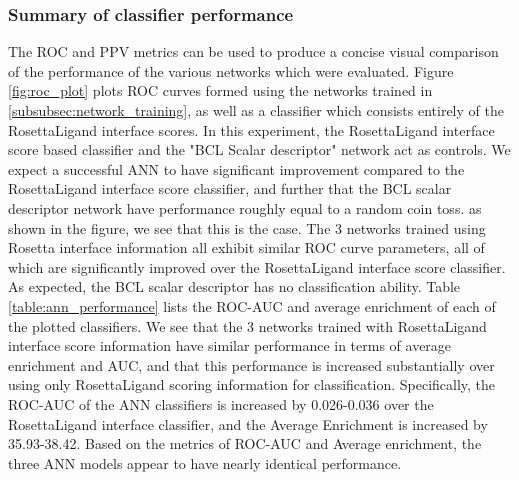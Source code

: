 \subsubsection{Summary of classifier performance}
\label{subsubsec:classifier_performance}
The \ac{ROC} and \ac{PPV} metrics can be used to produce a concise visual comparison of the performance of the various networks which were evaluated.
Figure \ref{fig:roc_plot} plots \ac{ROC} curves formed using the networks trained in \ref{subsubsec:network_training}, as well as a classifier which consists entirely of the RosettaLigand interface scores. 
In this experiment, the RosettaLigand interface score based classifier and the "\ac{BCL} Scalar descriptor" network act as controls.
We expect a successful \ac{ANN} to have significant improvement compared to the RosettaLigand interface score classifier, and further that the \ac{BCL} scalar descriptor network have performance roughly equal to a random coin toss.
as shown in the figure, we see that this is the case.  The 3 networks trained using Rosetta interface information all exhibit similar \ac{ROC} curve parameters, all of which are significantly improved over the RosettaLigand interface score classifier.
As expected, the \ac{BCL} scalar descriptor has no classification ability.
Table \ref{table:ann_performance} lists the \ac{ROC-AUC} and average enrichment of each of the plotted classifiers.
We see that the 3 networks trained with RosettaLigand interface score information have similar performance in terms of average enrichment and \ac{AUC}, and that this performance is increased substantially over using only RosettaLigand scoring information for classification.
Specifically, the \ac{ROC-AUC} of the \ac{ANN} classifiers is increased by 0.026-0.036 over the RosettaLigand interface classifier, and the Average Enrichment is increased by 35.93-38.42.
Based on the metrics of \ac{ROC-AUC} and Average enrichment, the three \ac{ANN} models appear to have nearly identical performance.
